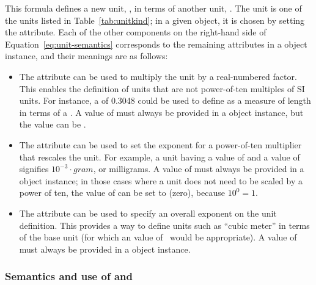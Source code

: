 This formula defines a new unit, \unew, in terms of another unit,
\ukind.  The unit \ukind is one of the units listed in
Table~\ref{tab:unitkind}; in a given \Unit object, it is
chosen by setting the  attribute.  Each of the other
components on the right-hand side of
Equation~\ref{eq:unit-semantics} corresponds to the remaining
attributes in a \Unit object instance, and their meanings are as
follows:
\begin{itemize}

\item The  attribute can be used to multiply the
   unit by a real-numbered factor.  This enables the
  definition of units that are not power-of-ten multiples of SI
  units.  For instance, a  of 0.3048 could be
  used to define  as a measure of length in terms of a
  .  A value of  must always be
  provided in a \Unit object instance, but the value can be
  .

\item The  attribute can be used to set the exponent
  for a power-of-ten multiplier that rescales the unit.  For
  example, a unit having a  value of  and a
   value of  signifies $10^{-3} \cdot gram$,
  or milligrams.  A value of  must always be provided
  in a \Unit object instance; in those cases where a unit does not
  need to be scaled by a power of ten, the value of 
  can be set to  (zero), because $10^0 = 1$.

\item The  attribute can be used to specify an
  overall exponent on the unit definition.  This provides a way to
  define units such as ``cubic meter'' in terms of the base unit
   (for which an  value of~
  would be appropriate).  A value of  must always
  be provided in a \Unit object instance.

\end{itemize}


\subsubsection{Semantics and use of  and }
\label{sec:unit-structure:semantics}

